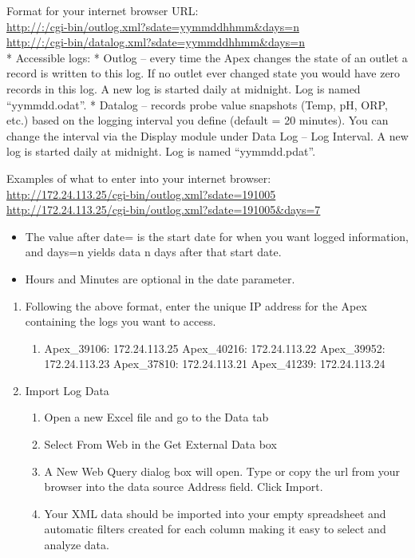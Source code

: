 \documentclass[]{book}
\providecommand{\tightlist}{%
  \setlength{\itemsep}{0pt}\setlength{\parskip}{0pt}}
\begin{document}
Format for your internet browser URL:\\
\url{http://:/cgi-bin/outlog.xml?sdate=yymmddhhmm\&days=n}\\
\url{http://:/cgi-bin/datalog.xml?sdate=yymmddhhmm\&days=n}\\
* Accessible logs: * Outlog -- every time the Apex changes the state of
an outlet a record is written to this log. If no outlet ever changed
state you would have zero records in this log. A new log is started
daily at midnight. Log is named ``yymmdd.odat''. * Datalog -- records
probe value snapshots (Temp, pH, ORP, etc.) based on the logging
interval you define (default = 20 minutes). You can change the interval
via the Display module under Data Log -- Log Interval. A new log is
started daily at midnight. Log is named ``yymmdd.pdat''.

Examples of what to enter into your internet browser:\\
\url{http://172.24.113.25/cgi-bin/outlog.xml?sdate=191005}\\
\url{http://172.24.113.25/cgi-bin/outlog.xml?sdate=191005\&days=7}

\begin{itemize}
\tightlist
\item
  The value after date= is the start date for when you want logged
  information, and days=n yields data n days after that start date.
\item
  Hours and Minutes are optional in the date parameter.
\end{itemize}

\begin{enumerate}
\def\labelenumi{\arabic{enumi}.}
\tightlist
\item
  Following the above format, enter the unique IP address for the Apex
  containing the logs you want to access.

  \begin{enumerate}
  \def\labelenumii{\arabic{enumii}.}
  \tightlist
  \item
    Apex\_39106: 172.24.113.25 Apex\_40216: 172.24.113.22 Apex\_39952:
    172.24.113.23 Apex\_37810: 172.24.113.21 Apex\_41239: 172.24.113.24
  \end{enumerate}
\item
  Import Log Data

  \begin{enumerate}
  \def\labelenumii{\arabic{enumii}.}
  \tightlist
  \item
    Open a new Excel file and go to the Data tab
  \item
    Select From Web in the Get External Data box
  \item
    A New Web Query dialog box will open. Type or copy the url from your
    browser into the data source Address field. Click Import.
  \item
    Your XML data should be imported into your empty spreadsheet and
    automatic filters created for each column making it easy to select
    and analyze data.
  \end{enumerate}
\end{enumerate}
\end{document}
